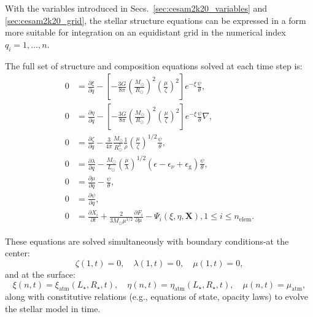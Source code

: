 \documentclass[12pt,a4paper]{article}
\newcommand{\mr}{\mathrm}
\newcommand{\pfird}[2][]{\frac{\partial#1}{\partial#2}}
\newcommand{\bvec}[1]{\boldsymbol{#1}}
\begin{document}
With the variables introduced in Secs.~\ref{sec:cesam2k20_variables} and \ref{sec:cesam2k20_grid}, the stellar structure equations can be expressed in a form more suitable for integration on an equidistant grid in the numerical index $q_i = 1, \ldots, n$. 

The full set of structure and composition equations solved at each time step is:
\begin{subequations} \label{eq:cesam2k20_struct_eq}
  \begin{align}
    0 &= \pfird[\xi]{q} - \left[-\frac{3G}{8\pi}\left(\frac{M_\odot}{R_\odot}\right)^2\left(\frac{\mu}{\zeta}\right)^2\right]e^{-\xi}\frac{\psi}{\theta}, \label{eq:cesam_struct1}\\
    0 &= \pfird[\eta]{q} - \left[-\frac{3G}{8\pi}\left(\frac{M_\odot}{R_\odot}\right)^2\left(\frac{\mu}{\zeta}\right)^2\right]e^{-\xi}\frac{\psi}{\theta}\nabla, \label{eq:cesam_struct2}\\
    0 &= \pfird[\zeta]{q} - \frac{3}{4\pi}\frac{M_\odot}{R_\odot^3}\frac{1}{\rho}\left(\frac{\mu}{\zeta}\right)^{1/2}\frac{\psi}{\theta}, \label{eq:cesam_struct3}\\
    0 &= \pfird[\lambda]{q} - \frac{M_\odot}{L_\odot}\left(\frac{\mu}{\lambda}\right)^{1/2}(\epsilon  - \epsilon_\nu + \epsilon_\mr{g})\frac{\psi}{\theta}, \label{eq:cesam_struct4}\\
    0 &= \pfird[\mu]{q} - \frac{\psi}{\theta}, \label{eq:cesam_struct5}\\
    0 &= \pfird[\psi]{q}, \label{eq:cesam_struct6}\\
    0 &= \pfird[X_i]{t} + \frac{2}{3 M_\odot\mu^{1/2}}\pfird[F_i]{\mu} - \Psi_i(\xi, \eta, \bvec{X}), 1\leq i \leq n_\mr{elem}. \label{eq:cesam_struct7}
  \end{align}
\end{subequations}

These equations are solved simultaneously with boundary conditions-at the center:
\begin{equation}
  \zeta(1, t) = 0,\quad \lambda(1, t) =0, \quad \mu(1, t) = 0,
\end{equation}
and at the surface:
\begin{equation}
  \xi(n, t) = \xi_\mr{atm}(L_\star, R_\star, t),\quad \eta(n, t) = \eta_\mr{atm}(L_\star, R_\star, t),\quad \mu(n, t) = \mu_\mr{atm},
\end{equation}
along with constitutive relations (e.g., equations of state, opacity laws) to evolve the stellar model in time.
\end{document}
